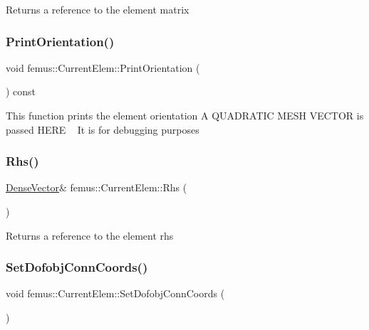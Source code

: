 Returns a reference to the element matrix \mbox{\label{classfemus_1_1_current_elem_a7733d1aa0d817b3288f96b7ad2fdce0b}} 
\subsubsection{\texorpdfstring{Print\+Orientation()}{PrintOrientation()}}
{\footnotesize\ttfamily void femus\+::\+Current\+Elem\+::\+Print\+Orientation (\begin{DoxyParamCaption}{ }\end{DoxyParamCaption}) const}

This function prints the element orientation A Q\+U\+A\+D\+R\+A\+T\+IC M\+E\+SH V\+E\+C\+T\+OR is passed H\+E\+RE ~\newline
It is for debugging purposes \mbox{\label{classfemus_1_1_current_elem_a8dded1c45dc6cf9d5f6d089fd0b91eda}} 
\subsubsection{\texorpdfstring{Rhs()}{Rhs()}}
{\footnotesize\ttfamily \mbox{\hyperlink{classfemus_1_1_dense_vector}{Dense\+Vector}}\& femus\+::\+Current\+Elem\+::\+Rhs (\begin{DoxyParamCaption}{ }\end{DoxyParamCaption})\hspace{0.3cm}{\ttfamily [inline]}}

Returns a reference to the element rhs \mbox{\label{classfemus_1_1_current_elem_a2f91b846308c3c8ab32aba4ac5f650b1}} 
\subsubsection{\texorpdfstring{Set\+Dofobj\+Conn\+Coords()}{SetDofobjConnCoords()}}
{\footnotesize\ttfamily void femus\+::\+Current\+Elem\+::\+Set\+Dofobj\+Conn\+Coords (\begin{DoxyParamCaption}{ }\end{DoxyParamCaption})}

